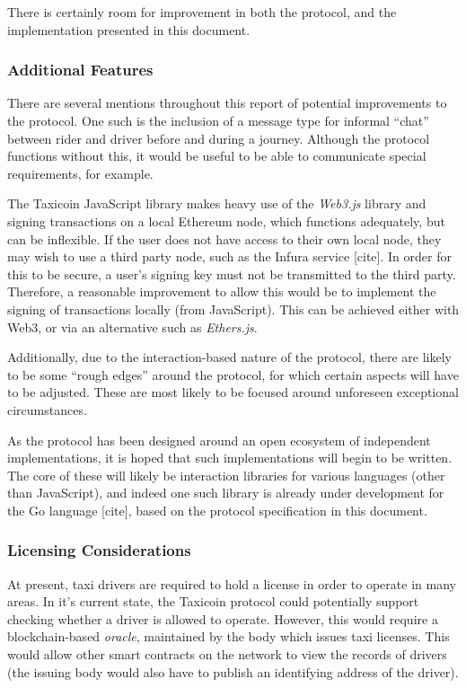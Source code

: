There is certainly room for improvement in both the protocol, and the implementation presented in this document.

\subsubsection{Additional Features}

There are several mentions throughout this report of potential improvements to the protocol. One such is the inclusion of a message type for informal \enquote{chat} between rider and driver before and during a journey. Although the protocol functions without this, it would be useful to be able to communicate special requirements, for example.

The Taxicoin JavaScript library makes heavy use of the \textit{Web3.js} library and signing transactions on a local Ethereum node, which functions adequately, but can be inflexible. If the user does not have access to their own local node, they may wish to use a third party node, such as the Infura service [cite]. In order for this to be secure, a user's signing key must not be transmitted to the third party. Therefore, a reasonable improvement to allow this would be to implement the signing of transactions locally (from JavaScript). This can be achieved either with Web3, or via an alternative such as \textit{Ethers.js}.

Additionally, due to the interaction-based nature of the protocol, there are likely to be some \enquote{rough edges} around the protocol, for which certain aspects will have to be adjusted. These are most likely to be focused around unforeseen exceptional circumstances.

As the protocol has been designed around an open ecosystem of independent implementations, it is hoped that such implementations will begin to be written. The core of these will likely be interaction libraries for various languages (other than JavaScript), and indeed one such library is already under development for the Go language [cite], based on the protocol specification in this document.

\subsubsection{Licensing Considerations}

At present, taxi drivers are required to hold a license in order to operate in many areas. In it's current state, the Taxicoin protocol could potentially support checking whether a driver is allowed to operate. However, this would require a blockchain-based \textit{oracle}, maintained by the body which issues taxi licenses. This would allow other smart contracts on the network to view the records of drivers (the issuing body would also have to publish an identifying address of the driver).

